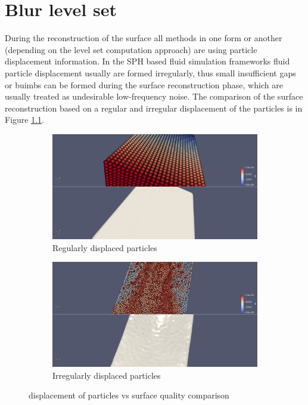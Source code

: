 \chapter{Blur level set}
During the reconstruction of the surface all methods in one form or another (depending on the level set computation approach) are using particle displacement information. In the SPH based fluid simulation frameworks fluid particle displacement usually are formed irregularly, thus small insufficient gaps or buimbs can be formed during the surface reconstruction phase, which are usually treated as undesirable low-frequency noise. The comparison of the surface reconstruction based on a regular and irregular displacement of the particles is in Figure \ref{fig:rec_vs_displacement}.
\begin{figure}[H]
	\begin{center}
		\begin{subfigure}[b]{0.6\textwidth}
			\includegraphics[width=\textwidth]{figures/FlatSurfaceWsParticleDisplacement.png}
			\caption{Regularly displaced particles}
		\end{subfigure}
		\begin{subfigure}[b]{0.6\textwidth}
			\includegraphics[width=\textwidth]{figures/NonFlatSurfaceWsParticleDisplacement.png}
			\caption{Irregularly displaced particles}
		\end{subfigure}
	\end{center}
	\caption{displacement of particles vs surface quality comparison}
	\label{fig:rec_vs_displacement}
\end{figure}
